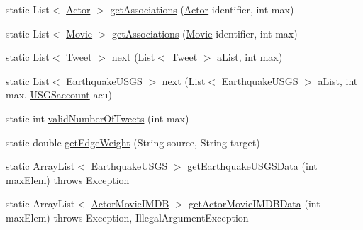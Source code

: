 \begin{DoxyCompactItemize}
\item 
static List$<$ \mbox{\hyperlink{classbridges_1_1data__src__dependent_1_1_actor}{Actor}} $>$ \mbox{\hyperlink{classbridges_1_1connect_1_1_data_formatter_a5e9f400a020b99e0bbba1fd5332a8f88}{get\+Associations}} (\mbox{\hyperlink{classbridges_1_1data__src__dependent_1_1_actor}{Actor}} identifier, int max)
\item 
static List$<$ \mbox{\hyperlink{classbridges_1_1data__src__dependent_1_1_movie}{Movie}} $>$ \mbox{\hyperlink{classbridges_1_1connect_1_1_data_formatter_ad0377b692c07836fb1016e5fb296e79c}{get\+Associations}} (\mbox{\hyperlink{classbridges_1_1data__src__dependent_1_1_movie}{Movie}} identifier, int max)
\item 
static List$<$ \mbox{\hyperlink{classbridges_1_1data__src__dependent_1_1_tweet}{Tweet}} $>$ \mbox{\hyperlink{classbridges_1_1connect_1_1_data_formatter_a3d0b2d2e0384d2a537bb61fbeb3d00a4}{next}} (List$<$ \mbox{\hyperlink{classbridges_1_1data__src__dependent_1_1_tweet}{Tweet}} $>$ a\+List, int max)
\item 
static List$<$ \mbox{\hyperlink{classbridges_1_1data__src__dependent_1_1_earthquake_u_s_g_s}{Earthquake\+U\+S\+GS}} $>$ \mbox{\hyperlink{classbridges_1_1connect_1_1_data_formatter_ad451dd96b927702127d383e85fc98661}{next}} (List$<$ \mbox{\hyperlink{classbridges_1_1data__src__dependent_1_1_earthquake_u_s_g_s}{Earthquake\+U\+S\+GS}} $>$ a\+List, int max, \mbox{\hyperlink{classbridges_1_1data__src__dependent_1_1_u_s_g_saccount}{U\+S\+G\+Saccount}} acu)
\item 
static int \mbox{\hyperlink{classbridges_1_1connect_1_1_data_formatter_ad17084ac8b0f28837ebb1d77905cefb8}{valid\+Number\+Of\+Tweets}} (int max)
\item 
static double \mbox{\hyperlink{classbridges_1_1connect_1_1_data_formatter_a2637c733e7f4efccfb56de0940506318}{get\+Edge\+Weight}} (String source, String target)
\item 
static Array\+List$<$ \mbox{\hyperlink{classbridges_1_1data__src__dependent_1_1_earthquake_u_s_g_s}{Earthquake\+U\+S\+GS}} $>$ \mbox{\hyperlink{classbridges_1_1connect_1_1_data_formatter_a31f1f3e398fbf7225c790dbbbde238dd}{get\+Earthquake\+U\+S\+G\+S\+Data}} (int max\+Elem)  throws Exception 
\item 
static Array\+List$<$ \mbox{\hyperlink{classbridges_1_1data__src__dependent_1_1_actor_movie_i_m_d_b}{Actor\+Movie\+I\+M\+DB}} $>$ \mbox{\hyperlink{classbridges_1_1connect_1_1_data_formatter_aa2a84fe044615b2e1b166d412babac0f}{get\+Actor\+Movie\+I\+M\+D\+B\+Data}} (int max\+Elem)  throws Exception, Illegal\+Argument\+Exception 

\end{DoxyCompactItemize}
